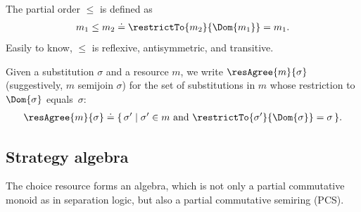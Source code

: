 \begin{definition}\label{def:partial-order} The partial order $\leq$ is defined as 
    \begin{align*}
      m_1 \leq m_2 \doteq \restrictTo{m_2}{\Dom{m_1}} = m_1.
    \end{align*}
Easily to know, $\leq$ is reflexive, antisymmetric, and transitive.
\end{definition}

\begin{definition}\label{def:res-agree-in-resource}
  Given a substitution $\sigma$ and a resource $m$, we write $\resAgree{m}{\sigma}$ (suggestively, $m$ semijoin $\sigma$) for the set of substitutions in $m$ whose restriction to $\Dom{\sigma}$ equals~$\sigma$:
  \begin{align*}
    \resAgree{m}{\sigma} \doteq \{\, \sigma' \mid \sigma' \in m \text{ and } \restrictTo{\sigma'}{\Dom{\sigma}} = \sigma \,\}.
  \end{align*}
\end{definition}

\subsection{Strategy algebra}

The choice resource forms an algebra, which is not only a partial commutative monoid as in separation logic, but also a partial commutative semiring (PCS).

